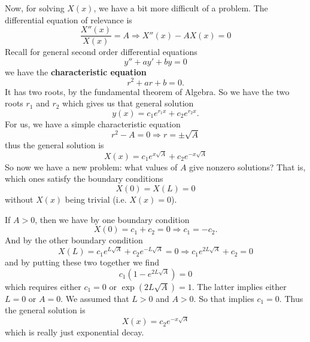 Now, for solving $X(x)$, we have a bit more difficult of a
problem. The differential equation of relevance is
\begin{equation}
\frac{X''(x)}{X(x)} = A\Rightarrow X''(x) - AX(x) = 0
\end{equation}
Recall for general second order differential equations
\begin{equation}
y'' + ay' + by = 0
\end{equation}
we have the \textbf{characteristic equation}
\begin{equation}
r^{2} + ar + b = 0.
\end{equation}
It has two roots, by the fundamental theorem of
Algebra. So we have
the two roots $r_{1}$ and $r_{2}$ which gives us that
general solution
\begin{equation}
y(x) = c_{1}e^{r_{1}x} + c_{2}e^{r_{2}x}.
\end{equation}
For us, we have a simple characteristic equation
\begin{equation}
r^{2} - A = 0\Rightarrow r = \pm\sqrt{A}
\end{equation}
thus the general solution is
\begin{equation}
X(x) = c_{1}e^{x\sqrt{A}} + c_{2}e^{-x\sqrt{A}}
\end{equation}
So now we have a new problem: what
values of $A$ give nonzero solutions? That is, which ones
satisfy the boundary conditions
\begin{equation}
X(0)=X(L)=0
\end{equation}
without $X(x)$ being trivial (i.e. $X(x)=0$).

If $A>0$, then we have by one boundary condition
\begin{equation}
X(0)=c_1 + c_2=0\Rightarrow c_1 = -c_2.
\end{equation}
And by the other boundary condition
\begin{equation}
X(L) = c_{1}e^{L\sqrt{A}}+c_{2}e^{-L\sqrt{A}} = 0\Rightarrow
c_{1}e^{2L\sqrt{A}}+c_{2}=0
\end{equation}
and by putting these two together we find
\begin{equation}
c_{1}(1 - e^{2L\sqrt{A}}) = 0
\end{equation}
which requires either $c_1=0$ or $\exp(2L\sqrt{A})=1$. The
latter implies either $L=0$ or $A=0$. We assumed that $L>0$
and $A>0$. So that implies $c_1=0$. Thus the general
solution is
\begin{equation}
X(x) = c_{2}e^{-x\sqrt{A}}
\end{equation}
which is really just exponential decay.

